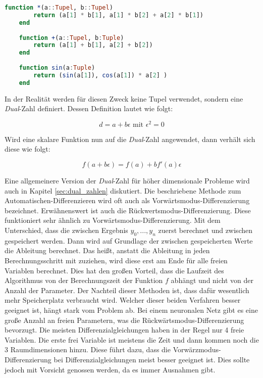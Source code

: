 \begin{lstlisting}[language=Julia]
	function *(a::Tupel, b::Tupel)
    	return (a[1] * b[1], a[1] * b[2] + a[2] * b[1]) 
    end
    
    function +(a::Tupel, b:Tuple)
    	return (a[1] + b[1], a[2] + b[2])
    end
    
    function sin(a:Tuple)
    	return (sin(a[1]), cos(a[1]) * a[2] ) 
    end
\end{lstlisting}

In der Realität werden für diesen Zweck keine Tupel verwendet, sondern eine \textit{Dual}-Zahl definiert.
Dessen Definition lautet wie folgt:

\begin{equation}
	d = a + b \epsilon \text{ mit } \epsilon^2 = 0
\end{equation}

Wird eine skalare Funktion nun auf die \textit{Dual}-Zahl angewendet, dann verhält sich diese wie folgt:

\begin{equation}
	f( a + b \epsilon) = f(a) + b f'(a) \epsilon
\end{equation}

Eine allgemeinere Version der \textit{Dual}-Zahl für höher dimensionale Probleme wird auch in Kapitel \ref{sec:dual_zahlen} diskutiert.
Die beschriebene Methode zum Automatischen-Differenzieren wird oft auch als Vorwärtsmodus-Differenzierung bezeichnet.
Erwähnenswert ist auch die Rückwertsmodus-Differenzierung.
Diese funktioniert sehr ähnlich zu Vorwärtsmodus-Differenzierung.
Mit dem Unterschied, dass die zwischen Ergebnis $y_0, ... , y_n$ zuerst berechnet und zwischen gespeichert werden.
Dann wird auf Grundlage der zwischen gespeicherten Werte die Ableitung berechnet.
Das heißt, anstatt die Ableitung in jeden Berechnungsschritt mit zuziehen, wird diese erst am Ende für alle freien Variablen berechnet.
Dies hat den großen Vorteil, dass die Laufzeit des Algorithmus von der Berechnungszeit der Funktion $f$ abhängt und nicht von der Anzahl der Parameter.
Der Nachteil dieser Methoden ist, dass dafür wesentlich mehr Speicherplatz verbraucht wird.
Welcher dieser beiden Verfahren besser geeignet ist, hängt stark vom Problem ab.
Bei einem neuronalen Netz gibt es eine große Anzahl an freien Parametern, was die Rückwärtsmodus-Differenzierung bevorzugt.
Die meisten Differenzialgleichungen haben in der Regel nur 4 freie Variablen.
Die erste frei Variable ist meistens die Zeit und dann kommen noch die 3 Raumdimensionen hinzu.
Diese führt dazu, dass die Vorwärzmodus-Differenzierung bei Differenzialgleichungen meist besser geeignet ist.
Dies sollte jedoch mit Vorsicht genossen werden, da es immer Ausnahmen gibt.

